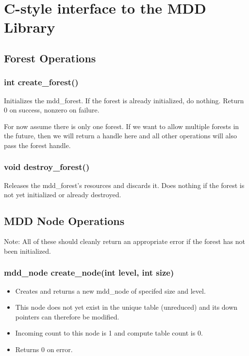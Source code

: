 \documentclass[12pt]{article}
\newcommand{\TBD}[1]{{\color{blue}{\bf TBD:} #1}}
\begin{document}
\section{C-style interface to the MDD Library}

\subsection{Forest Operations}

\subsubsection{int create\_forest()}

Initializes the mdd\_forest.
If the forest is already initialized, do nothing.
Return 0 on success, nonzero on failure.

\TBD{
For now assume there is only one forest.
If we want to allow multiple forests in the future,
then we will return a handle here and all other operations will
also pass the forest handle.
}

\subsubsection{void destroy\_forest()}

Releases the mdd\_forest's resources and discards it.
Does nothing if the forest is not yet initialized or already destroyed.

\subsection{MDD Node Operations}

Note: All of these should cleanly return an appropriate error if the 
forest has not been initialized.

\subsubsection{mdd\_node create\_node(int level, int size)}

\begin{itemize}
\item
Creates and returns a new mdd\_node of specifed size and level. 
\item
This node does not yet exist in the unique table (unreduced) and 
its down pointers can therefore be modified.
\item
Incoming count to this node is 1 and compute table count is 0.
\item
Returns 0 on error.
\end{itemize}
\end{document}
